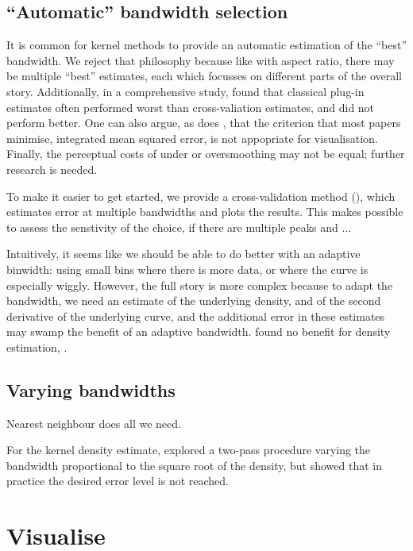 \documentclass[journal]{vgtc}                %
\begin{document}
\subsection{``Automatic'' bandwidth selection}

It is common for kernel methods to provide an automatic estimation of the ``best'' bandwidth. We reject that philosophy because like with aspect ratio, there may be multiple ``best'' estimates, each which focusses on different parts of the overall story. Additionally, in a comprehensive study, \cite{loader:1999} found that classical plug-in estimates often performed worst than cross-valiation estimates, and did not perform better. One can also argue, as does \citep{denby:2009}, that the criterion that most papers minimise, integrated mean squared error, is not appopriate for visualisation. Finally, the perceptual costs of under or oversmoothing may not be equal; further research is needed.

To make it easier to get started, we provide a cross-validation method (\citep{efron:1983}), which estimates error at multiple bandwidths and plots the results.  This makes possible to assess the senstivity of the choice, if there are multiple peaks and ...

Intuitively, it seems like we should be able to do better with an adaptive binwidth: using small bins where there is more data, or where the curve is especially wiggly. However, the full story is more complex because to adapt the bandwidth, we need an estimate of the underlying density, and of the second derivative of the underlying curve, and the additional error in these estimates may swamp the benefit of an adaptive bandwidth. \cite{terrell:1992} found no benefit for density estimation, \citep{fan:1992,brockmann:1993,schucany:1995,herrmann:1997}.

\citep{abramson:1982}

\subsection{Varying bandwidths}

Nearest neighbour does all we need. 

For the kernel density estimate, \citep{abramson:1982} explored a two-pass procedure varying the bandwidth proportional to the square root of the density, but \cite{terrell:1992} showed that in practice the desired error level is not reached. 


\section{Visualise}
\label{sec:visualise}
\end{document}
